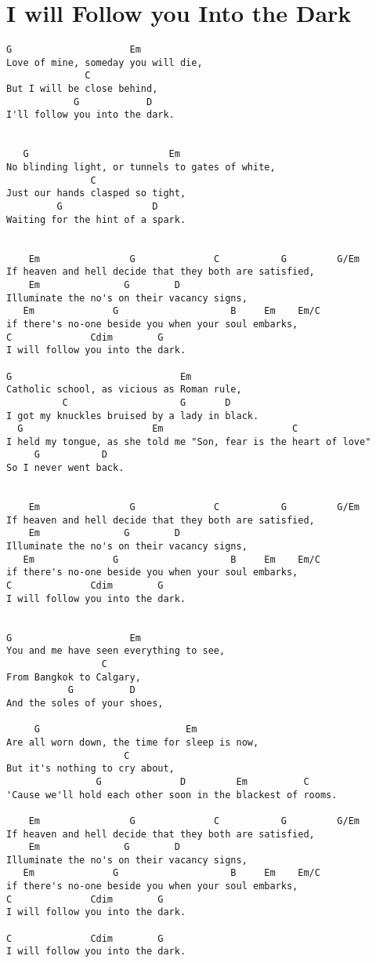 \documentclass[leqno]{memoir}
\begin{document}
\chapter{I will Follow you Into the Dark}
\begin{verbatim}
G                     Em
Love of mine, someday you will die,
              C
But I will be close behind,
            G            D
I'll follow you into the dark.


   G                         Em
No blinding light, or tunnels to gates of white,
               C
Just our hands clasped so tight,
         G                D
Waiting for the hint of a spark.


    Em                G              C           G         G/Em
If heaven and hell decide that they both are satisfied,
    Em               G        D
Illuminate the no's on their vacancy signs,
   Em              G                    B     Em    Em/C
if there's no-one beside you when your soul embarks,
C              Cdim        G  
I will follow you into the dark.

G                              Em
Catholic school, as vicious as Roman rule,
          C                    G       D
I got my knuckles bruised by a lady in black.
  G                       Em                       C
I held my tongue, as she told me "Son, fear is the heart of love"
     G           D       
So I never went back.


    Em                G              C           G         G/Em
If heaven and hell decide that they both are satisfied,
    Em               G        D
Illuminate the no's on their vacancy signs,
   Em              G                    B     Em    Em/C
if there's no-one beside you when your soul embarks,
C              Cdim        G  
I will follow you into the dark.


G                     Em      
You and me have seen everything to see,
                 C
From Bangkok to Calgary,
           G          D
And the soles of your shoes,

     G                          Em     
Are all worn down, the time for sleep is now,
                     C
But it's nothing to cry about,
                G              D         Em          C
'Cause we'll hold each other soon in the blackest of rooms.

    Em                G              C           G         G/Em
If heaven and hell decide that they both are satisfied,
    Em               G        D
Illuminate the no's on their vacancy signs,
   Em              G                    B     Em    Em/C
if there's no-one beside you when your soul embarks,
C              Cdim        G  
I will follow you into the dark.

C              Cdim        G  
I will follow you into the dark.
\end{verbatim}
\newpage
\end{document}
